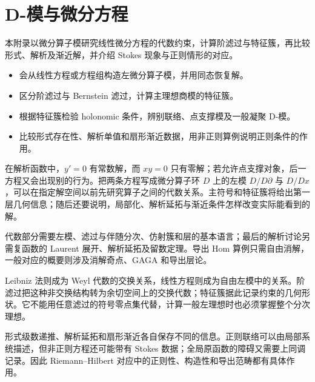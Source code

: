 
\chapter{D-模与微分方程}
\label{b5:app:D}

\begin{chapterabstract}
	本附录以微分算子模研究线性微分方程的代数约束，计算阶滤过与特征簇，再比较形式、解析及渐近解，并介绍 Stokes 现象与正则情形的对应。
\end{chapterabstract}

\begin{learninggoals}
	\begin{itemize}
		\item 会从线性方程或方程组构造左微分算子模，并用同态恢复解。
		\item 区分阶滤过与 Bernstein 滤过，计算主理想商模的特征簇。
		\item 根据特征簇检验 holonomic 条件，辨别联络、点支撑模及一般凝聚 D-模。
		\item 比较形式存在性、解析单值和扇形渐近数据，用非正则算例说明正则条件的作用。
	\end{itemize}
\end{learninggoals}

在解析函数中，\(y'=0\) 有常数解，而 \(xy=0\) 只有零解；若允许点支撑对象，后一方程又会出现别的行为。把两条方程写成微分算子环 \(D\) 上的左模 \(D/D\partial\) 与 \(D/Dx\)，可以在指定解空间以前先研究算子之间的代数关系。主符号和特征簇将给出第一层几何信息；随后还要说明，局部化、解析延拓与渐近条件怎样改变实际能看到的解。

\ProseParagraphBreak
代数部分需要左模、滤过与伴随分次、仿射簇和层的基本语言；最后的解析讨论另需复函数的 Laurent 展开、解析延拓及留数定理。导出 Hom 算例只需自由消解，一般对应的概要则涉及消解奇点、GAGA 和导出层论。




\begin{chaptersummary}
	Leibniz 法则成为 Weyl 代数的交换关系，线性方程则成为自由左模中的关系。阶滤过把这种非交换结构转为余切空间上的交换代数；特征簇据此记录约束的几何形状。它不能用任意滤过的符号零点集代替，计算一般左理想时也必须掌握整个分次理想。

	\ProseParagraphBreak
	形式级数递推、解析延拓和扇形渐近各自保存不同的信息。正则联络可以由局部系统描述，但非正则方程还可能带有 Stokes 数据；全局原函数的障碍又需要上同调记录。因此 Riemann--Hilbert 对应中的正则性、构造性和导出范畴都有具体作用。
\end{chaptersummary}

